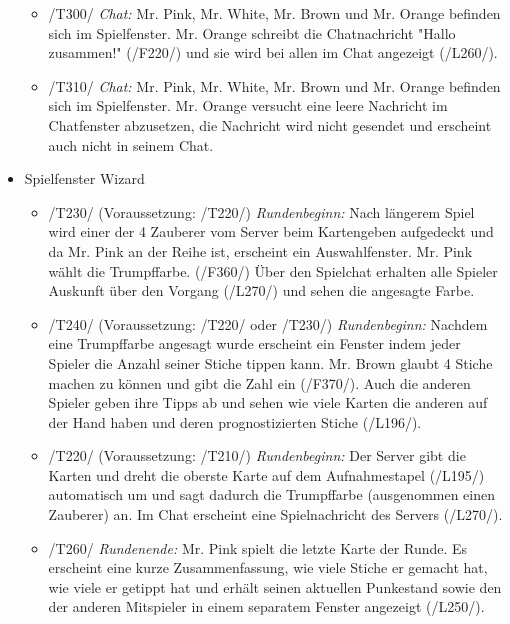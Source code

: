 \documentclass{article}
\begin{document}
\begin{itemize}
\begin{itemize}
		\item /T300/ \textit{Chat:} Mr. Pink, Mr. White, Mr. Brown und Mr. Orange befinden sich im Spielfenster. Mr. Orange schreibt die Chatnachricht "Hallo zusammen!" (/F220/) und sie wird bei allen im Chat angezeigt (/L260/).
	
		\item /T310/ \textit{Chat:} Mr. Pink, Mr. White, Mr. Brown und Mr. Orange befinden sich im Spielfenster. Mr. Orange versucht eine leere Nachricht im Chatfenster abzusetzen, die Nachricht wird nicht gesendet und erscheint auch nicht in seinem Chat.
			
	\end{itemize}
	
	\item Spielfenster Wizard
	
	\begin{itemize}

		\item /T230/ (Voraussetzung: /T220/) \textit{Rundenbeginn:} Nach längerem Spiel wird einer der 4 Zauberer vom Server beim Kartengeben aufgedeckt und da Mr. Pink an der Reihe ist, erscheint ein Auswahlfenster. Mr. Pink wählt die Trumpffarbe. (/F360/) Über den Spielchat erhalten alle Spieler Auskunft über den Vorgang (/L270/) und sehen die angesagte Farbe.
	
		\item /T240/ (Voraussetzung: /T220/ oder /T230/) \textit{Rundenbeginn:} Nachdem eine Trumpffarbe angesagt wurde erscheint ein Fenster indem jeder Spieler die Anzahl seiner Stiche tippen kann. Mr. Brown glaubt 4 Stiche machen zu können und gibt die Zahl ein (/F370/). Auch die anderen Spieler geben ihre Tipps ab und sehen wie viele Karten die anderen auf der Hand haben und deren prognostizierten Stiche (/L196/).

		\item /T220/ (Voraussetzung: /T210/) \textit{Rundenbeginn:} Der Server gibt die Karten und dreht die oberste Karte auf dem Aufnahmestapel (/L195/) automatisch um und sagt dadurch die Trumpffarbe (ausgenommen einen Zauberer) an. Im Chat erscheint eine Spielnachricht des Servers (/L270/).
		
				\item /T260/ \textit{Rundenende:} Mr. Pink spielt die letzte Karte der Runde. Es erscheint eine kurze Zusammenfassung, wie viele Stiche er gemacht hat, wie viele er getippt hat und erhält seinen aktuellen Punkestand sowie den der anderen Mitspieler in einem separatem Fenster angezeigt (/L250/).
					

\end{itemize}
\end{itemize}
\end{document}
